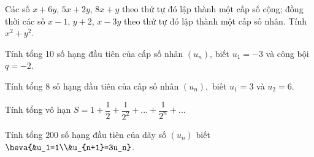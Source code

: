 \begin{bt}%

	Các số $x+6y$, $5x+2y$, $8x+y$ theo thứ tự đó lập thành một cấp số cộng; đồng thời các số $x-1$, $y+2$, $x-3y$ theo thứ tự đó lập thành một cấp số nhân. Tính $x^2+y^2$.
\end{bt}

\begin{bt}%
	Tính tổng 10 số hạng đầu tiên của cấp số nhân $(u_n)$, biết $u_1=-3$ và công bội $q=-2$. 
\end{bt}

\begin{bt}%
	Tính tổng $8$ số hạng đầu tiên của cấp số nhân $(u_n),$ biết $u_1=3$ và $u_2=6$. 
\end{bt}

\begin{bt}%
	Tính tổng vô hạn $S=1+\dfrac{1}{2}+\dfrac{1}{2^2}+...+\dfrac{1}{2^n}+...$ 
\end{bt}

\begin{bt}%
	Tính tổng $200$ số hạng đầu tiên của dãy số $(u_n)$ biết $\heva{&u_1=1\\&u_{n+1}=3u_n}$.
\end{bt}

